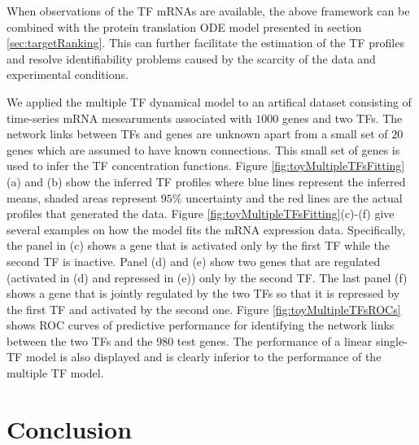 \documentclass{article}
\begin{document}
When observations of the TF mRNAs are available, the above framework
can be combined with the protein translation
ODE model presented in section \ref{sec:targetRanking}. 
This can further facilitate the estimation of the TF 
profiles and resolve identifiability problems caused by 
the scarcity of the data and experimental 
conditions.  


We applied the multiple TF dynamical model to an artifical dataset
consisting of time-series mRNA mesearuments associated with
$1000$ genes and two TFs. The network links between TFs and genes are
unknown apart from a small set of $20$ genes which are assumed to have
known connections. This small set of genes is used to infer the TF
concentration functions. Figure \ref{fig:toyMultipleTFsFitting}(a) and
(b) show the inferred TF profiles  where blue lines represent 
the inferred means, shaded areas represent 
$95\%$ uncertainty and the red lines are the actual profiles that generated
the data. Figure \ref{fig:toyMultipleTFsFitting}(c)-(f) give
several examples on how the model fits the mRNA expression data. 
Specifically, the panel in (c) shows a gene that is activated only by the
first TF while the second TF is inactive.  Panel (d) and (e) show two genes that are regulated 
(activated in (d) and repressed in (e)) only by the second TF.  
The last panel (f) shows a gene that is jointly regulated by the
two TFs so that it is repressed by the first TF and activated by the
second one.  Figure \ref{fig:toyMultipleTFsROCs} shows 
ROC curves of predictive performance for identifying the network
links between the two TFs and the $980$ test genes.  The performance of
a linear single-TF model is also displayed and is clearly inferior to
the performance of the multiple TF model.   


\section{Conclusion}


  
\end{document}

